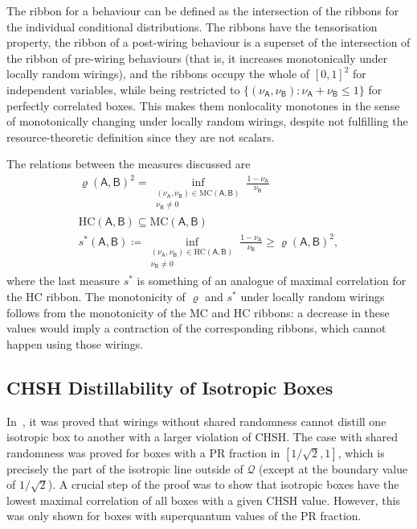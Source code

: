 \documentclass[10pt, a4paper]{article}
\numberwithin{equation}{section} %
\theoremstyle{definition}
\theoremstyle{plain}
\newcommand{\st}{\mathrel{:}} %
\newcommand{\?}{\mathrel{?}} %
\newcommand{\crv}[1]{\mathsf{#1}}
\newcommand{\HC}{\mathrm{HC}}
\newcommand{\MC}{\mathrm{MC}}
\newcommand{\Qs}{\mathcal{Q}}
\begin{document}
                  The ribbon for a behaviour can be defined as the intersection of the ribbons for the individual conditional distributions. The ribbons have the tensorisation property, the ribbon of a post-wiring behaviour is a superset of the intersection of the ribbon of pre-wiring behaviours (that is, it increases monotonically under locally random wirings), and the ribbons occupy the whole of \({[0,1]}^2\) for independent variables, while being restricted to \(\{(\nu_{\crv{A}}, \nu_{\crv{B}}) \st \nu_{\crv{A}} + \nu_{\crv{B}} \leq 1\}\) for perfectly correlated boxes. This makes them nonlocality monotones in the sense of monotonically changing under locally random wirings, despite not fulfilling the resource-theoretic definition since they are not scalars.

                  The relations between the measures discussed are
                  \begin{gather}
                    {\varrho(\crv{A},\crv{B})}^2 = \inf_{\substack{(\nu_{\crv{A}}, \nu_{\crv{B}}) \in \MC(\crv{A},\crv{B}) \\ \nu_{\crv{B}} \neq 0}} \frac{1 - \nu_{\crv{A}}}{\nu_{\crv{B}}} \\
                    \HC(\crv{A},\crv{B}) \subseteq \MC(\crv{A},\crv{B}) \\
                    s^*(\crv{A},\crv{B}) \coloneqq \inf_{\substack{(\nu_{\crv{A}}, \nu_{\crv{B}}) \in \HC(\crv{A},\crv{B}) \\ \nu_{\crv{B}} \neq 0}} \frac{1 - \nu_{\crv{A}}}{\nu_{\crv{B}}} \geq {\varrho(\crv{A},\crv{B})}^2,
                  \end{gather}
                  where the last measure \(s^*\) is something of an analogue of maximal correlation for the HC ribbon. The monotonicity of \(\varrho\) and \(s^*\) under locally random wirings follows from the monotonicity of the MC and HC ribbons: a decrease in these values would imply a contraction of the corresponding ribbons, which cannot happen using those wirings.

                  \subsection{CHSH Distillability of Isotropic Boxes}\label{sec:wirmono_isodist}

                  In~\cite{NLMonotones}, it was proved that wirings without shared randomness cannot distill one isotropic box to another with a larger violation of CHSH. The case with shared randomness was proved for boxes with a PR fraction in \([1/\sqrt{2}, 1]\), which is precisely the part of the isotropic line outside of \(\Qs\) (except at the boundary value of \(1/\sqrt{2}\)). A crucial step of the proof was to show that isotropic boxes have the lowest maximal correlation of all boxes with a given CHSH value. However, this was only shown for boxes with superquantum values of the PR fraction.
\end{document}
